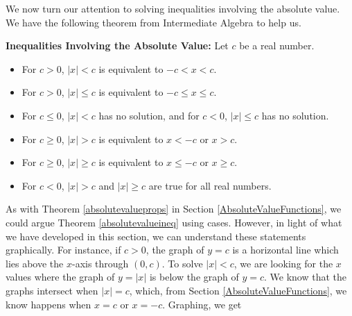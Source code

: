 \pagebreak

We now turn our attention to solving inequalities involving the absolute value. We have the following theorem from Intermediate Algebra to help us.

\smallskip

\colorbox{ResultColor}{\bbm
\begin{thm}  \label{absolutevalueineq} \textbf{Inequalities Involving the Absolute Value:}  Let $c$ be a real number.  

\begin{itemize}

\item  For $c > 0$, $|x| < c$ is equivalent to $-c<x<c$.

\item  For $c > 0$, $|x| \leq c$ is equivalent to $-c \leq x \leq c$.

\item  For $c \leq 0$, $|x| < c$ has no solution, and for $c < 0$, $|x| \leq c$ has no solution.

\item  For $c \geq 0$, $|x| > c$ is equivalent to $x<-c$ or $x>c$.

\item  For $c \geq 0$, $|x| \geq c$ is equivalent to $x \leq -c$ or $x \geq c$.

\item  For $c < 0$, $|x| > c$ and $|x| \geq c$ are true for all real numbers.

\end{itemize}

\end{thm}
\ebm}

\medskip

As with Theorem \ref{absolutevalueprops} in Section \ref{AbsoluteValueFunctions}, we could argue Theorem \ref{absolutevalueineq} using cases.  However, in light of what we have developed in this section, we can understand these statements graphically.  For instance, if $c > 0$, the graph of $y=c$ is a horizontal line which lies above the $x$-axis through $(0,c)$.  To solve $|x| < c$, we are looking for the $x$ values where the graph of $y=|x|$ is below the graph of $y=c$.  We know that the graphs intersect when $|x|=c$, which, from Section \ref{AbsoluteValueFunctions}, we know happens when $x=c$ or $x=-c$.  Graphing, we get

